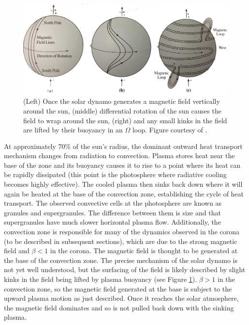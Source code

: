 \begin{figure}[!h]
    \begin{center}
	    \includegraphics[width=\textwidth]{Images/MagneticFieldGeneration.png}
    \end{center}
    \caption[Surfacing of magnetic field]{
        (Left) Once the solar dynamo generates a magnetic field vertically around the sun, (middle) differential rotation 
        of the sun causes the field to wrap around the sun, (right) and any small kinks in the field are lifted by their 
        buoyancy in an $\Omega$ loop. Figure courtesy of \citet{Lang2001}.       
    }
    \label{fig:magfieldgeneration}
\end{figure}

At approximately 70\% of the sun's radius, the dominant outward heat transport mechanism changes from radiation to convection. Plasma stores heat near the base of the zone and its buoyancy causes it to rise to a point where its heat can be rapidly dissipated (this point is the photosphere where radiative cooling becomes highly effective). The cooled plasma then sinks back down where it will again be heated at the base of the convection zone, establishing the cycle of heat transport. The observed convective cells at the photosphere are known as granules and supergranules. The difference between them is size and that supergranules have much slower horizontal plasma flow. Additionally, the convection zone is responsible for many of the dynamics observed in the corona (to be described in subsequent sections), which are due to the strong magnetic field and $\beta < 1$ in the corona. The magnetic field is thought to be generated at the base of the convection zone. The precise mechanism of the solar dynamo is not yet well understood, but the surfacing of the field is likely described by slight kinks in the field being lifted by plasma buoyancy (see Figure \ref{fig:magfieldgeneration}). 
$\beta > 1$ in the convection zone, so the magnetic field generated at the base is subject to the upward plasma motion as just described. Once it reaches the solar atmosphere, the magnetic field dominates and so is not pulled back down with the sinking plasma. 


